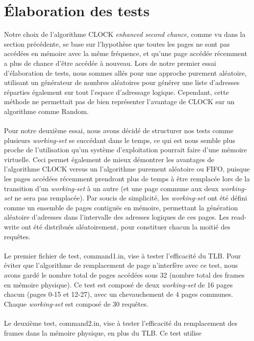 \documentclass{article}
\begin{document}
\section{Élaboration des tests}
\setlength{\parindent}{20pt}
Notre choix de l’algorithme CLOCK \emph{enhanced second chance}, comme vu dans la section précédente, se base sur l’hypothèse que toutes les pages ne sont pas
 accédées en mémoire avec la même fréquence, et qu’une page accédée récemment a plus de chance d’être accédée à nouveau. 
Lors de notre premier essai d’élaboration de tests, nous sommes allés pour une approche purement aléatoire, utilisant un générateur de nombres
 aléatoires pour générer une liste d’adresses réparties également sur tout l’espace d’adressage logique. Cependant, cette méthode ne permettait 
 pas de bien représenter l’avantage de CLOCK sur un algorithme comme Random.\\
\\
Pour notre deuxième essai, nous avons décidé de structurer nos tests comme plusieurs \emph{working-set} se succédant dans le temps, ce qui est nous 
semble plus proche de l’utilisation qu’un système d’exploitation pourrait faire d’une mémoire virtuelle. Ceci permet également de mieux démontrer 
les avantages de l’algorithme CLOCK versus un l’algorithme purement aléatoire ou FIFO, puisque les pages accédées récemment prendront plus de 
temps à être remplacée lors de la transition d’un \emph{working-set} à un autre (et une page commune aux deux \emph{working-set} ne sera pas remplacée).
Par soucis de simplicité, les \emph{working-set} ont été défini comme un ensemble de pages contiguës en mémoire, permettant la génération aléatoire 
d’adresses dans l’intervalle des adresses logiques de ces pages. Les read-write ont été distribués aléatoirement, pour constituer chacun la 
moitié des requêtes.\\    
\\
Le premier fichier de test, command1.in, vise à tester l’efficacité du TLB. Pour éviter que l’algorithme de remplacement de page n’interfère 
avec ce test, nous avons gardé le nombre total de pages accédées sous 32 (nombre total des frames en mémoire physique). Ce test est composé de 
deux \emph{working-set} de 16 pages chacun (pages 0-15 et 12-27), avec un chevauchement de 4 pages communes. Chaque \emph{working-set} est composé de 30 requêtes.\\ 
\\
Le deuxième test, command2.in, vise à tester l’efficacité du remplacement des frames dans la mémoire physique, en plus du TLB. Ce test utilise 
\end{document}
